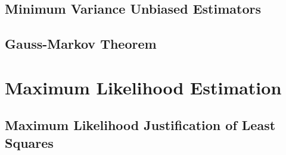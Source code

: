 \documentclass[11pt]{report} %
\begin{document}
\subsection{Minimum Variance Unbiased Estimators}

\subsection{Gauss-Markov Theorem}

\section{Maximum Likelihood Estimation}

\subsection{Maximum Likelihood Justification of Least Squares}
\end{document}

